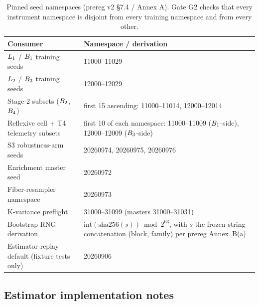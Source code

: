 \begin{table}[h]
\centering
\small
\begin{tabular}{p{6.2cm}p{6.4cm}}
\toprule
Consumer & Namespace / derivation \\
\midrule
$L_{1}$ / $B_{1}$ training seeds & 11000--11029 \\
$L_{2}$ / $B_{3}$ training seeds & 12000--12029 \\
Stage-2 subsets ($B_{2}$, $B_{4}$) & first 15 ascending: 11000--11014,
12000--12014 \\
Reflexive cell $+$ T4 telemetry subsets & first 10 of each namespace:
11000--11009 ($B_{1}$-side), 12000--12009 ($B_{3}$-side) \\
S3 robustness-arm seeds & 20260974, 20260975, 20260976 \\
Enrichment master seed & 20260972 \\
Fiber-resampler namespace & 20260973 \\
K-variance preflight & 31000--31099 (masters 31000--31031) \\
Bootstrap RNG derivation &
$\mathrm{int}(\mathrm{sha256}(s)) \bmod 2^{63}$, with $s$ the frozen-string
concatenation (block, family) per prereg Annex~B(a) \\
Estimator replay default (fixture tests only) & 20260906 \\
\bottomrule
\end{tabular}
\caption{Pinned seed namespaces (prereg v2 \S7.4 / Annex A). Gate G2 checks
that every instrument namespace is disjoint from every training namespace
and from every other.}
\label{tab:seeds}
\end{table}

\subsection{Estimator implementation notes}
\label{app:engine-estimators}

